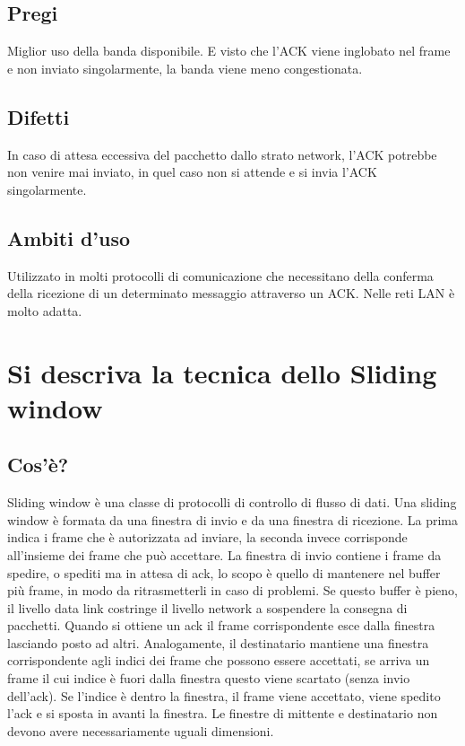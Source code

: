 \subsection{Pregi}
Miglior uso della banda disponibile. E visto che l'ACK viene inglobato nel frame e non inviato singolarmente, la banda viene meno congestionata.

\subsection{Difetti}
In caso di attesa eccessiva del pacchetto dallo strato network, l'ACK potrebbe non venire mai inviato, in quel caso non si attende e si invia l'ACK singolarmente.

\subsection{Ambiti d'uso}
Utilizzato in molti protocolli di comunicazione che necessitano della conferma della ricezione di un determinato messaggio attraverso un ACK. Nelle reti LAN è molto adatta.

\section{Si descriva la tecnica dello Sliding window}
\subsection{Cos'è?}
Sliding window è una classe di protocolli di controllo di flusso di dati.
Una sliding window è formata da una finestra di invio e da una finestra di ricezione. La prima indica i frame che è autorizzata ad inviare, la seconda invece corrisponde all'insieme dei frame che può accettare.
La finestra di invio contiene i frame da spedire, o spediti ma in attesa di ack, lo scopo è quello di mantenere nel buffer più frame, in modo da ritrasmetterli in caso di problemi. Se questo buffer è pieno, il livello data link costringe il livello network a sospendere la consegna di pacchetti. Quando si ottiene un ack il frame corrispondente esce dalla finestra lasciando posto ad altri.
Analogamente, il destinatario mantiene una finestra corrispondente agli indici dei frame che possono essere accettati, se arriva un frame il cui indice è fuori dalla finestra questo viene scartato (senza invio dell'ack). Se l'indice è dentro la finestra, il frame viene accettato, viene spedito l'ack e si sposta in avanti la finestra.
Le finestre di mittente e destinatario non devono avere necessariamente uguali dimensioni.

